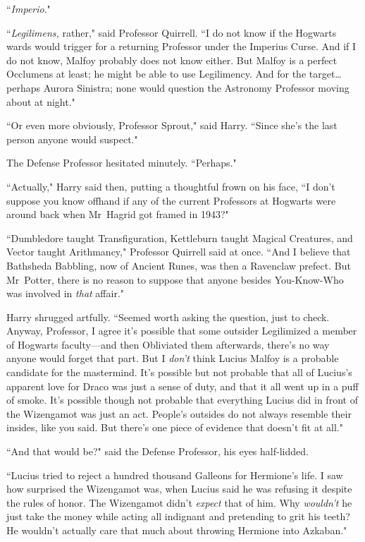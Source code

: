 ``\emph{Imperio}."

``\emph{Legilimens,} rather," said Professor Quirrell. ``I do not know if the Hogwarts wards would trigger for a returning Professor under the Imperius Curse. And if I do not know, Malfoy probably does not know either. But Malfoy is a perfect Occlumens at least; he might be able to use Legilimency. And for the target{\ldots} perhaps Aurora Sinistra; none would question the Astronomy Professor moving about at night."

``Or even more obviously, Professor Sprout," said Harry. ``Since she's the last person anyone would suspect."

The Defense Professor hesitated minutely. ``Perhaps."

``Actually," Harry said then, putting a thoughtful frown on his face, ``I don't suppose you know offhand if any of the current Professors at Hogwarts were around back when Mr~Hagrid got framed in 1943?"

``Dumbledore taught Transfiguration, Kettleburn taught Magical Creatures, and Vector taught Arithmancy," Professor Quirrell said at once. ``And I believe that Bathsheda Babbling, now of Ancient Runes, was then a Ravenclaw prefect. But Mr~Potter, there is no reason to suppose that anyone besides You-Know-Who was involved in \emph{that} affair."

Harry shrugged artfully. ``Seemed worth asking the question, just to check. Anyway, Professor, I agree it's possible that some outsider Legilimized a member of Hogwarts faculty—and then Obliviated them afterwards, there's no way anyone would forget that part. But I \emph{don't} think Lucius Malfoy is a probable candidate for the mastermind. It's possible but not probable that all of Lucius's apparent love for Draco was just a sense of duty, and that it all went up in a puff of smoke. It's possible though not probable that everything Lucius did in front of the Wizengamot was just an act. People's outsides do not always resemble their insides, like you said. But there's one piece of evidence that doesn't fit at all."

``And that would be?" said the Defense Professor, his eyes half-lidded.

``Lucius tried to reject a hundred thousand Galleons for Hermione's life. I saw how surprised the Wizengamot was, when Lucius said he was refusing it despite the rules of honor. The Wizengamot didn't \emph{expect} that of him. Why \emph{wouldn't} he just take the money while acting all indignant and pretending to grit his teeth? He wouldn't actually care that much about throwing Hermione into Azkaban."

